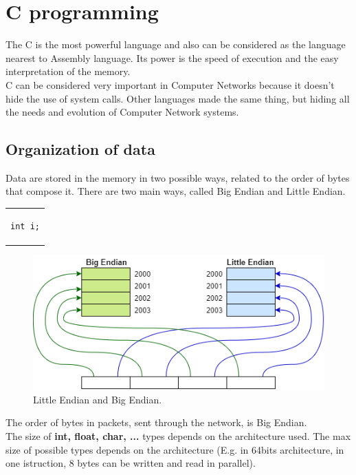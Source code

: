 \chapter{C programming}
The C is the most powerful language and also can be considered as the language nearest to Assembly language. Its power is the speed of execution and the easy interpretation of the memory.\\
C can be considered very important in Computer Networks because it doesn't hide the use of system calls. Other languages made the same thing, but hiding all the needs and evolution of Computer Network systems.

\section{Organization of data}\label{littleBig}
Data are stored in the memory in two possible ways, related to the order of bytes that compose it. There are two main ways, called Big Endian and Little Endian.
\begin{center}
\begin{tabular}{c}
\begin{lstlisting}[linewidth=30pt, basicstyle=\footnotesize\sffamily,]
int i;
\end{lstlisting}
\end{tabular}
\end{center}

\begin{figure}[h]
\centering
\includegraphics[scale=0.68]{Images/Programming/endians}
\caption{\footnotesize{Little Endian and Big Endian.}}
\end{figure}

The order of bytes in packets, sent through the network, is Big Endian.\\
The size of \textbf{int, float, char, ...} types
depends on the architecture used. The max size of possible types depends on the architecture (E.g. in 64bits architecture, in one istruction, 8 bytes can be written and read in parallel).

